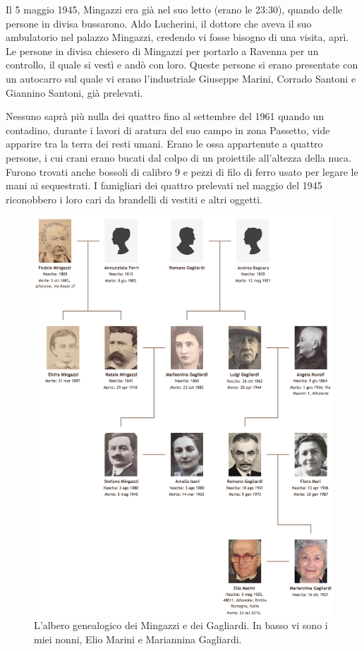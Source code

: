 Il 5 maggio 1945, Mingazzi era già nel suo letto (erano le 23:30), quando delle persone in divisa bussarono. Aldo Lucherini, il dottore che aveva il suo ambulatorio nel palazzo Mingazzi, credendo vi fosse bisogno di una visita, aprì. Le persone in divisa chiesero di Mingazzi per portarlo a Ravenna per un controllo, il quale si vestì e andò con loro. Queste persone si erano presentate con un autocarro sul quale vi erano l'industriale Giuseppe Marini, Corrado Santoni e Giannino Santoni, già prelevati.
\newpage

Nessuno saprà più nulla dei quattro fino al settembre del 1961 quando un contadino, durante i lavori di aratura del suo campo in zona Passetto, vide apparire tra la terra dei resti umani. Erano le ossa appartenute a quattro persone, i cui crani erano bucati dal colpo di un proiettile all'altezza della nuca. Furono trovati anche bossoli di calibro 9 e pezzi di filo di ferro usato per legare le mani ai sequestrati. I famigliari dei quattro prelevati nel maggio del 1945 riconobbero i loro cari da brandelli di vestiti e altri oggetti.

 \begin{figure}[htb]
    \centering
    \includegraphics[width=\textwidth]{albero}
    \caption[Albero Genealogico]{L'albero genealogico dei Mingazzi e dei Gagliardi. In basso vi sono i miei nonni, Elio Marini e Mariannina Gagliardi.}
\end{figure}
